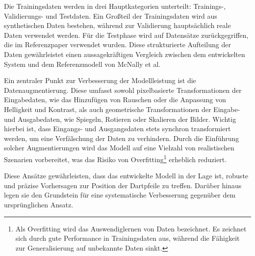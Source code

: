 Die Trainingsdaten werden in drei Hauptkategorien unterteilt: Trainings-, Validierungs- und Testdaten.
Ein Großteil der Trainingsdaten wird aus synthetischen Daten bestehen, während zur Validierung hauptsächlich reale Daten verwendet werden. Für die Testphase wird auf Datensätze zurückgegriffen, die im Referenzpaper verwendet wurden. Diese strukturierte Aufteilung der Daten gewährleistet einen aussagekräftigen Vergleich zwischen dem entwickelten System und dem Referenzmodell von McNally et al.

Ein zentraler Punkt zur Verbesserung der Modellleistung ist die Datenaugmentierung. Diese umfasst sowohl pixelbasierte Transformationen der Eingabedaten, wie das Hinzufügen von Rauschen oder die Anpassung von Helligkeit und Kontrast, als auch geometrische Transformationen der Eingabe- und Ausgabedaten, wie Spiegeln, Rotieren oder Skalieren der Bilder. Wichtig hierbei ist, dass Eingangs- und Ausgangsdaten stets synchron transformiert werden, um eine Verfälschung der Daten zu verhindern. Durch die Einführung solcher Augmentierungen wird das Modell auf eine Vielzahl von realistischen Szenarien vorbereitet, was das Risiko von Overfitting\footnote{Als Overfitting wird das Auswendiglernen von Daten bezeichnet. Es zeichnet sich durch gute Performance in Trainingsdaten aus, während die Fähigkeit zur Generalisierung auf unbekannte Daten sinkt.} erheblich reduziert.

Diese Ansätze gewährleisten, dass das entwickelte Modell in der Lage ist, robuste und präzise Vorhersagen zur Position der Dartpfeile zu treffen. Darüber hinaus legen sie den Grundstein für eine systematische Verbesserung gegenüber dem ursprünglichen Ansatz.

